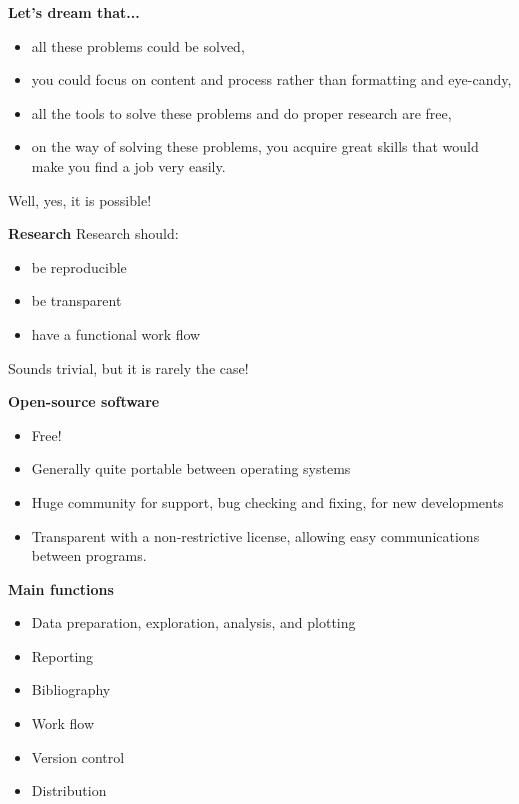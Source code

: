 \documentclass[9pt,xcolor=pdftex,dvipsnames,table]{beamer}
\begin{document}
\begin{frame}{\textbf{Let's dream that...}}
\begin{itemize}
\item all these problems could be solved,
\item you could focus on content and process rather than formatting
  and eye-candy,
\item all the tools to solve these problems and do proper research are free,
\item on the way of solving these problems, you acquire great skills
  that would make you find a job very easily.
\end{itemize}
\vspace{0.6cm}
Well, yes, it is possible!
\vspace{-0.5cm}
\end{frame}


\begin{frame}{\textbf{Research}}
Research should:
\begin{itemize}
\item be reproducible
\item be transparent
\item have a functional work flow
\end{itemize}
\vspace{0.6cm}
Sounds trivial, but it is rarely the case!
\vspace{-0.5cm}
\end{frame}


\begin{frame}{\textbf{Open-source software}}
\begin{itemize}
\item Free!
\item Generally quite portable between operating systems
\item Huge community for support, bug checking and fixing, for new developments
\item Transparent with a non-restrictive license, allowing easy
  communications between programs.
\end{itemize}
\end{frame}


\begin{frame}{\textbf{Main functions}}
\begin{itemize}
\item Data preparation, exploration, analysis, and plotting
\item Reporting
\item Bibliography
\item Work flow
\item Version control
\item Distribution
\end{itemize}
\end{frame}
\end{document}
